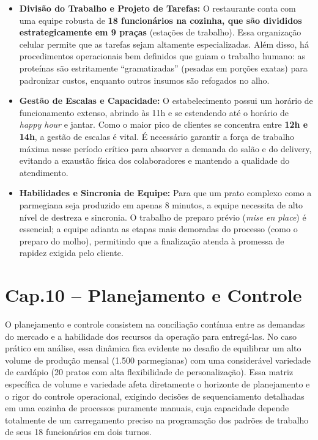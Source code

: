 \documentclass[12pt, a4paper]{article}
\begin{document}
\begin{itemize}
    \item \textbf{Divisão do Trabalho e Projeto de Tarefas:} O restaurante conta com uma equipe robusta de \textbf{18 funcionários na cozinha, que são divididos estrategicamente em 9 praças} (estações de trabalho). Essa organização celular permite que as tarefas sejam altamente especializadas. Além disso, há procedimentos operacionais bem definidos que guiam o trabalho humano: as proteínas são estritamente ``gramatizadas'' (pesadas em porções exatas) para padronizar custos, enquanto outros insumos são refogados no alho.
    \item \textbf{Gestão de Escalas e Capacidade:} O estabelecimento possui um horário de funcionamento extenso, abrindo às 11h e se estendendo até o horário de \textit{happy hour} e jantar. Como o maior pico de clientes se concentra entre \textbf{12h e 14h}, a gestão de escalas é vital. É necessário garantir a força de trabalho máxima nesse período crítico para absorver a demanda do salão e do delivery, evitando a exaustão física dos colaboradores e mantendo a qualidade do atendimento.
    \item \textbf{Habilidades e Sincronia de Equipe:} Para que um prato complexo como a parmegiana seja produzido em apenas 8 minutos, a equipe necessita de alto nível de destreza e sincronia. O trabalho de preparo prévio (\textit{mise en place}) é essencial; a equipe adianta as etapas mais demoradas do processo (como o preparo do molho), permitindo que a finalização atenda à promessa de rapidez exigida pelo cliente.
\end{itemize}



\section{Cap.10 – Planejamento e Controle}

O planejamento e controle consistem na conciliação contínua entre as demandas do mercado e a habilidade dos recursos da operação para entregá-las. No caso prático em análise, essa dinâmica fica evidente no desafio de equilibrar um alto volume de produção mensal (1.500 parmegianas) com uma considerável variedade de cardápio (20 pratos com alta flexibilidade de personalização). Essa matriz específica de volume e variedade afeta diretamente o horizonte de planejamento e o rigor do controle operacional, exigindo decisões de sequenciamento detalhadas em uma cozinha de processos puramente manuais, cuja capacidade depende totalmente de um carregamento preciso na programação dos padrões de trabalho de seus 18 funcionários em dois turnos.
\end{document}
